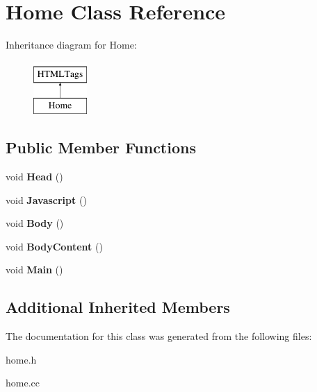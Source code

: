 \hypertarget{classHome}{\section{Home Class Reference}
\label{classHome}
}
Inheritance diagram for Home\-:\begin{figure}[H]
\begin{center}
\leavevmode
\includegraphics[height=2.000000cm]{classHome}
\end{center}
\end{figure}
\subsection*{Public Member Functions}
\begin{DoxyCompactItemize}
\item 
\hypertarget{classHome_aa327c2af7868c60c181806734e3b00f6}{void {\bfseries Head} ()}\label{classHome_aa327c2af7868c60c181806734e3b00f6}

\item 
\hypertarget{classHome_aa603fee7511d68025346d1e7fed09e80}{void {\bfseries Javascript} ()}\label{classHome_aa603fee7511d68025346d1e7fed09e80}

\item 
\hypertarget{classHome_a008d316a2ff266216dffc74042b6bd25}{void {\bfseries Body} ()}\label{classHome_a008d316a2ff266216dffc74042b6bd25}

\item 
\hypertarget{classHome_ab4cc0a979a58aea15ffdf20517b8f4e4}{void {\bfseries Body\-Content} ()}\label{classHome_ab4cc0a979a58aea15ffdf20517b8f4e4}

\item 
\hypertarget{classHome_aaecd93781c4fa1bd9d7a287c929be2fd}{void {\bfseries Main} ()}\label{classHome_aaecd93781c4fa1bd9d7a287c929be2fd}

\end{DoxyCompactItemize}
\subsection*{Additional Inherited Members}


The documentation for this class was generated from the following files\-:\begin{DoxyCompactItemize}
\item 
home.\-h\item 
home.\-cc\end{DoxyCompactItemize}
